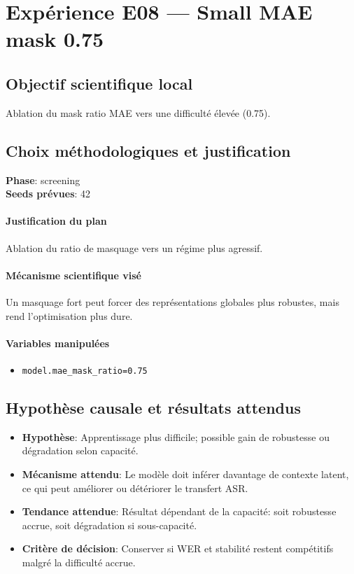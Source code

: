 \documentclass[11pt,a4paper]{article}
\begin{document}
\section{Expérience E08 --- Small MAE mask 0.75}
\subsection{Objectif scientifique local}
Ablation du mask ratio MAE vers une difficulté élevée (0.75).

\subsection{Choix méthodologiques et justification}
\textbf{Phase}: screening\\
\textbf{Seeds prévues}: 42\\


\paragraph{Justification du plan}
Ablation du ratio de masquage vers un régime plus agressif.

\paragraph{Mécanisme scientifique visé}
Un masquage fort peut forcer des représentations globales plus robustes, mais rend l'optimisation plus dure.

\paragraph{Variables manipulées}
\begin{itemize}
\item \texttt{model.mae\_mask\_ratio=0.75}
\end{itemize}

\subsection{Hypothèse causale et résultats attendus}
\begin{itemize}[leftmargin=1.2cm]
\item \textbf{Hypothèse}: Apprentissage plus difficile; possible gain de robustesse ou dégradation selon capacité.
\item \textbf{Mécanisme attendu}: Le modèle doit inférer davantage de contexte latent, ce qui peut améliorer ou détériorer le transfert ASR.
\item \textbf{Tendance attendue}: Résultat dépendant de la capacité: soit robustesse accrue, soit dégradation si sous-capacité.
\item \textbf{Critère de décision}: Conserver si WER et stabilité restent compétitifs malgré la difficulté accrue.
\end{itemize}
\end{document}
